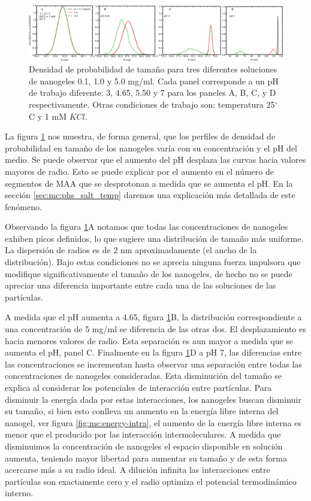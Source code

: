 	\begin{figure}
		\centering
		\includegraphics[width=0.99\linewidth]{Figures/graph-mc/sizes-phs.pdf}
		\caption{Densidad de probabilidad de tama\~no para tres diferentes soluciones de nanogeles 0.1, 1.0 y 5.0 mg/ml. Cada panel corresponde a un pH de trabajo diferente: 3, 4.65, 5.50 y 7 para los paneles A, B, C, y D respectivamente. Otras condiciones de trabajo son: temperatura 25$^\circ$C y 1 mM  $KCl$.}
		\label{fig:mc:densidad-probabilidad}
	\end{figure}
	
	La figura \ref{fig:mc:densidad-probabilidad} nos muestra, de forma general, que los perfiles de densidad de probabilidad en tama\~no de los nanogeles var\'ia con su concentraci\'on y el pH del medio. Se puede observar que el aumento del pH desplaza las curvas hacia valores mayores de radio. Esto se puede explicar por el aumento en el n\'umero de segmentos de MAA que se desprotonan a medida que se aumenta el pH. En la secci\'on \ref{sec:mc:phs_salt_temp} daremos una explicaci\'on m\'as detallada de este fen\'omeno.
	
	Observando la figura \ref{fig:mc:densidad-probabilidad}A notamos que todas las concentraciones de nanogeles exhiben picos definidos, lo que sugiere una distribuci\'on de tama\~no m\'as uniforme. La dispersi\'on de radios es de 2 nm aproximadamente (el ancho de la distribuci\'on). Bajo estas condiciones no se aprecia ninguna fuerza impulsora que modifique significativamente el tama\~no de los nanogeles, de hecho no se puede apreciar una diferencia importante entre cada una de las soluciones de las part\'iculas.
	
	A medida que el pH aumenta a 4.65, figura \ref{fig:mc:densidad-probabilidad}B, la distribuci\'on correspondiente a una concentraci\'on de 5 mg/ml se diferencia de las otras dos. El desplazamiento es hacia menores valores de radio. Esta separaci\'on es aun mayor a medida que se aumenta el pH, panel C. Finalmente en la figura \ref{fig:mc:densidad-probabilidad}D a pH 7, las diferencias entre las concentraciones se incrementan hasta observar una separaci\'on entre todas las concentraciones de nanogeles consideradas. Esta disminuci\'on del tama\~no se explica al considerar los potenciales de interacci\'on entre part\'iculas. Para disminuir la energ\'ia dada por estas interacciones, los nanogeles buscan disminuir su tama\~no, si bien esto conlleva un aumento en la energ\'ia libre interna del nanogel, ver figura \ref{fig:mc:energy-intra}, el aumento de la energ\'ia libre interna es menor que el producido por las interacci\'on intermoleculares. A medida que disminuimos la concentraci\'on de nanogeles el espacio disponible en soluci\'on aumenta, teniendo mayor libertad para  aumentar su tama\~no y de esta forma acercarse m\'as a su radio ideal. A  diluci\'on infinita las  interacciones entre part\'iculas son exactamente cero y el radio optimiza el potencial termodin\'amico interno. 
	
